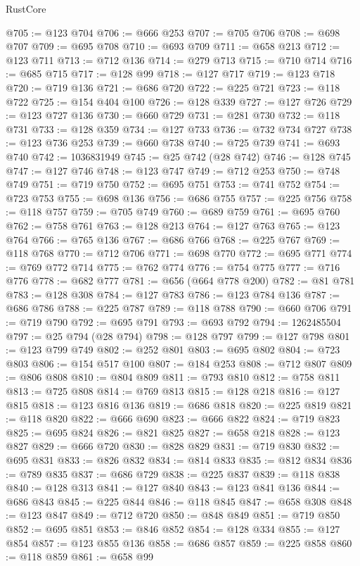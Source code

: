 \begin{lexlean}{RustCore}
\begin{coremodule}
@705 := @123 @704
@706 := @666 @253
@707 := @705 @706
@708 := @698 @707
@709 := @695 @708
@710 := @693 @709
@711 := @658 @213
@712 := @123 @711
@713 := @712 @136
@714 := @279 @713
@715 := @710 @714
@716 := @685 @715
@717 := @128 @99
@718 := @127 @717
@719 := @123 @718
@720 := @719 @136
@721 := @686 @720
@722 := @225 @721
@723 := @118 @722
@725 := @154 @404 @100
@726 := @128 @339
@727 := @127 @726
@729 := @123 @727 @136
@730 := @660 @729
@731 := @281 @730
@732 := @118 @731
@733 := @128 @359
@734 := @127 @733
@736 := @732 @734 @727
@738 := @123 @736 @253
@739 := @660 @738
@740 := @725 @739
@741 := @693 @740
@742 := 1036831949
@745 := @25 @742 (@28 @742)
@746 := @128 @745
@747 := @127 @746
@748 := @123 @747
@749 := @712 @253
@750 := @748 @749
@751 := @719 @750
@752 := @695 @751
@753 := @741 @752
@754 := @723 @753
@755 := @698 @136
@756 := @686 @755
@757 := @225 @756
@758 := @118 @757
@759 := @705 @749
@760 := @689 @759
@761 := @695 @760
@762 := @758 @761
@763 := @128 @213
@764 := @127 @763
@765 := @123 @764
@766 := @765 @136
@767 := @686 @766
@768 := @225 @767
@769 := @118 @768
@770 := @712 @706
@771 := @698 @770
@772 := @695 @771
@774 := @769 @772 @714
@775 := @762 @774
@776 := @754 @775
@777 := @716 @776
@778 := @682 @777
@781 := @656 (@664 @778 @200)
@782 := @81 @781
@783 := @128 @308
@784 := @127 @783
@786 := @123 @784 @136
@787 := @686 @786
@788 := @225 @787
@789 := @118 @788
@790 := @660 @706
@791 := @719 @790
@792 := @695 @791
@793 := @693 @792
@794 := 1262485504
@797 := @25 @794 (@28 @794)
@798 := @128 @797
@799 := @127 @798
@801 := @123 @799 @749
@802 := @252 @801
@803 := @695 @802
@804 := @723 @803
@806 := @154 @517 @100
@807 := @184 @253
@808 := @712 @807
@809 := @806 @808
@810 := @804 @809
@811 := @793 @810
@812 := @758 @811
@813 := @725 @808
@814 := @769 @813
@815 := @128 @218
@816 := @127 @815
@818 := @123 @816 @136
@819 := @686 @818
@820 := @225 @819
@821 := @118 @820
@822 := @666 @690
@823 := @666 @822
@824 := @719 @823
@825 := @695 @824
@826 := @821 @825
@827 := @658 @218
@828 := @123 @827
@829 := @666 @720
@830 := @828 @829
@831 := @719 @830
@832 := @695 @831
@833 := @826 @832
@834 := @814 @833
@835 := @812 @834
@836 := @789 @835
@837 := @686 @729
@838 := @225 @837
@839 := @118 @838
@840 := @128 @313
@841 := @127 @840
@843 := @123 @841 @136
@844 := @686 @843
@845 := @225 @844
@846 := @118 @845
@847 := @658 @308
@848 := @123 @847
@849 := @712 @720
@850 := @848 @849
@851 := @719 @850
@852 := @695 @851
@853 := @846 @852
@854 := @128 @334
@855 := @127 @854
@857 := @123 @855 @136
@858 := @686 @857
@859 := @225 @858
@860 := @118 @859
@861 := @658 @99

\end{coremodule}
\end{lexlean}
